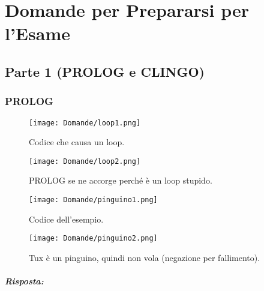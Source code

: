 \chapter{Domande per Prepararsi per l'Esame}

\section{Parte 1 (PROLOG e CLINGO)}

\subsection{PROLOG}



\begin{figure}[h]
    \centering
    \begin{minipage}{0.45\textwidth}
        \centering
        \texttt{[image: Domande/loop1.png]}
        \caption{Codice che causa un loop.}
    \end{minipage}
    \hfill
    \begin{minipage}{0.45\textwidth}
        \centering
        \texttt{[image: Domande/loop2.png]}
        \caption{PROLOG se ne accorge perché è un loop stupido.}
    \end{minipage}
\end{figure}



\begin{figure}[h]
    \centering
    \begin{minipage}{0.45\textwidth}
        \centering
        \texttt{[image: Domande/pinguino1.png]}
        \caption{Codice dell'esempio.}
    \end{minipage}
    \hfill
    \begin{minipage}{0.45\textwidth}
        \centering
        \texttt{[image: Domande/pinguino2.png]}
        \caption{Tux è un pinguino, quindi non vola (negazione per fallimento).}
    \end{minipage}
\end{figure}




\paragraph{Risposta:}

